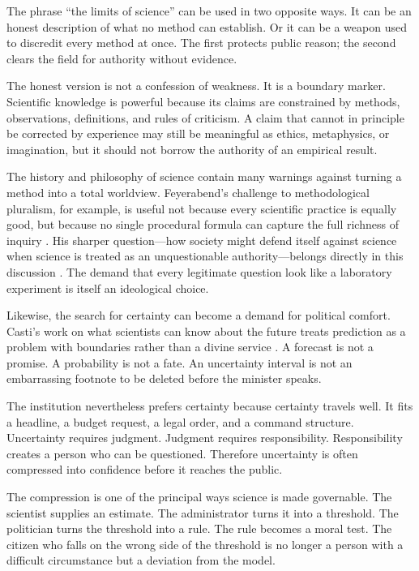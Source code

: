 ﻿\documentclass[12pt,a4paper]{book}
\begin{document}
The phrase ``the limits of science'' can be used in two opposite ways. It can
be an honest description of what no method can establish. Or it can be a
weapon used to discredit every method at once. The first protects public
reason; the second clears the field for authority without evidence.

The honest version is not a confession of weakness. It is a boundary marker.
Scientific knowledge is powerful because its claims are constrained by
methods, observations, definitions, and rules of criticism. A claim that
cannot in principle be corrected by experience may still be meaningful as
ethics, metaphysics, or imagination, but it should not borrow the authority
of an empirical result.

The history and philosophy of science contain many warnings against turning a
method into a total worldview. Feyerabend's challenge to methodological
pluralism, for example, is useful not because every scientific practice is
equally good, but because no single procedural formula can capture the full
richness of inquiry \cite{Feyerabend2001May,feyerabend-defense}. His sharper
question---how society might defend itself against science when science is
treated as an unquestionable authority---belongs directly in this discussion
\cite{feyerabend-defense}. The demand that every legitimate question look like
a laboratory experiment is itself an ideological choice.

Likewise, the search for certainty can become a demand for political comfort.
Casti's work on what scientists can know about the future treats prediction as
a problem with boundaries rather than a divine service
\cite{casti:92a}. A forecast is not a promise. A probability is not a fate. An
uncertainty interval is not an embarrassing footnote to be deleted before the
minister speaks.

The institution nevertheless prefers certainty because certainty travels well.
It fits a headline, a budget request, a legal order, and a command structure.
Uncertainty requires judgment. Judgment requires responsibility. Responsibility
creates a person who can be questioned. Therefore uncertainty is often
compressed into confidence before it reaches the public.

The compression is one of the principal ways science is made governable. The
scientist supplies an estimate. The administrator turns it into a threshold.
The politician turns the threshold into a rule. The rule becomes a moral test.
The citizen who falls on the wrong side of the threshold is no longer a person
with a difficult circumstance but a deviation from the model.
\end{document}
